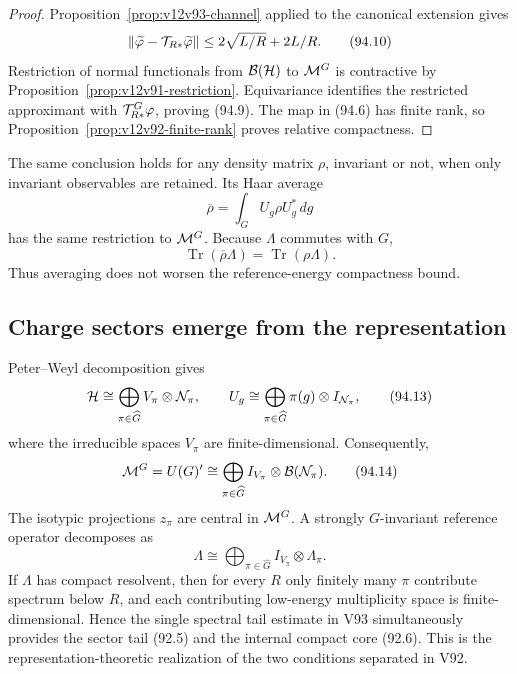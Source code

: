 \documentclass[11pt]{article}
\theoremstyle{remark}
\begin{document}
\begin{proof}
Proposition~\ref{prop:v12v93-channel} applied to the canonical
extension gives
\[
 \|\widetilde\varphi-
       {\cal T}_{R*}\widetilde\varphi\|
 \leq2\sqrt{L/R}+2L/R.                                           \tag{94.10}
\]
Restriction of normal functionals from \({\cal B}({\cal H})\) to
\({\cal M}^G\) is contractive by
Proposition~\ref{prop:v12v91-restriction}.  Equivariance identifies
the restricted approximant with
\({\cal T}_{R*}^G\varphi\), proving (94.9).  The map in (94.6) has
finite rank, so
Proposition~\ref{prop:v12v92-finite-rank} proves relative
compactness.
\end{proof}

The same conclusion holds for any density matrix \(\rho\), invariant
or not, when only invariant observables are retained.  Its Haar
average
\[
 \overline\rho=\int_GU_g\rho U_g^*\,dg                           \tag{94.11}
\]
has the same restriction to \({\cal M}^G\).  Because \(\Lambda\)
commutes with \(G\),
\[
 \operatorname{Tr}(\overline\rho\Lambda)
 =\operatorname{Tr}(\rho\Lambda).                                \tag{94.12}
\]
Thus averaging does not worsen the reference-energy compactness
bound.

\subsection{Charge sectors emerge from the representation}

Peter--Weyl decomposition gives
\[
 {\cal H}\cong
 \bigoplus_{\pi\in\widehat G}
 V_\pi\otimes{\cal N}_\pi,\qquad
 U_g\cong\bigoplus_{\pi\in\widehat G}
 \pi(g)\otimes I_{{\cal N}_\pi},                                 \tag{94.13}
\]
where the irreducible spaces \(V_\pi\) are finite-dimensional.
Consequently,
\[
 {\cal M}^G=U(G)'
 \cong\bigoplus_{\pi\in\widehat G}
 I_{V_\pi}\otimes{\cal B}({\cal N}_\pi).                         \tag{94.14}
\]
The isotypic projections \(z_\pi\) are central in
\({\cal M}^G\).  A strongly \(G\)-invariant reference operator
decomposes as
\[
 \Lambda\cong\bigoplus_{\pi\in\widehat G}
 I_{V_\pi}\otimes\Lambda_\pi.                                   \tag{94.15}
\]
If \(\Lambda\) has compact resolvent, then for every \(R\) only
finitely many \(\pi\) contribute spectrum below \(R\), and each
contributing low-energy multiplicity space is finite-dimensional.
Hence the single spectral tail estimate in V93 simultaneously
provides the sector tail (92.5) and the internal compact core
(92.6).  This is the representation-theoretic realization of the
two conditions separated in V92.
\end{document}
